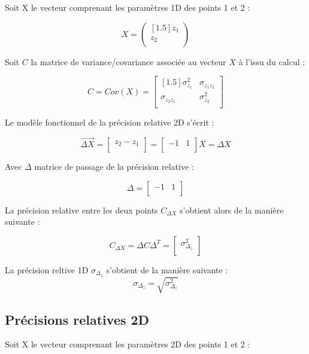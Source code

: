 \documentclass[french]{report}
\begin{document}
Soit X le vecteur comprenant les paramètres 1D des points 1 et 2 :

$$X=\begin{pmatrix}[1.5] z_1 \\ z_2 \\ \end{pmatrix}$$

Soit $C$ la matrice de variance/covariance associée au vecteur $X$ à l'issu du calcul :

$$C=Cov(X)=\begin{bmatrix}[1.5]
\sigma_{z_{1}}^2 & \sigma_{z_{1}z_{2}} \\
\sigma_{z_{2}z_{1}} & \sigma_{z_{2}}^2 \\ \end{bmatrix}$$

Le modèle fonctionnel de la précision relative 2D s'écrit :

$$\overrightarrow{\Delta X}=
\begin{bmatrix} z_2 - z_1 \\ \end{bmatrix}=
\begin{bmatrix} -1 & 1 \\ \end{bmatrix} X =
\Delta X
$$


Avec $\Delta$ matrice de passage de la précision relative :

$$ \Delta = \begin{bmatrix} -1 & 1 \\ \end{bmatrix}$$

La précision relative entre les deux points $C_{\Delta X}$ s'obtient alors de la manière suivante :

$$C_{\Delta X}=\Delta C \Delta^T=\begin{bmatrix} \sigma_{\Delta_{z}}^2 \\ \end{bmatrix}$$

La précision reltive 1D $\sigma_{\Delta_{z}}$ s'obtient de la manière suivante :
$$\sigma_{\Delta_{z}}=\sqrt{\sigma_{\Delta_{z}}^2} $$



\subsection{Précisions relatives 2D}

Soit X le vecteur comprenant les paramètres 2D des points 1 et 2 :
\end{document}

